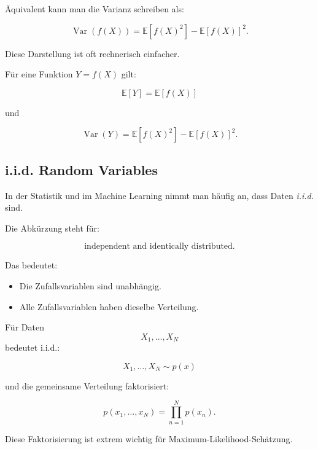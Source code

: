 \documentclass[11pt,a4paper]{scrartcl}
\begin{document}
\begin{calculationbox}
    Äquivalent kann man die Varianz schreiben als:

    \[
        \operatorname{Var}(f(X))
        =
        \mathbb{E}[f(X)^2]
        -
        \mathbb{E}[f(X)]^2.
    \]

    Diese Darstellung ist oft rechnerisch einfacher.
\end{calculationbox}

\begin{answerbox}
    Für eine Funktion \(Y=f(X)\) gilt:

    \[
        \boxed{
            \mathbb{E}[Y]
            =
            \mathbb{E}[f(X)]
        }
    \]

    und

    \[
        \boxed{
            \operatorname{Var}(Y)
            =
            \mathbb{E}[f(X)^2]
            -
            \mathbb{E}[f(X)]^2.
        }
    \]
\end{answerbox}

\subsection{i.i.d. Random Variables}

\begin{notebox}
    In der Statistik und im Machine Learning nimmt man häufig an, dass Daten
    \emph{i.i.d.} sind.

    Die Abkürzung steht für:

    \[
        \text{independent and identically distributed}.
    \]

    Das bedeutet:

    \begin{itemize}
        \item Die Zufallsvariablen sind unabhängig.
        \item Alle Zufallsvariablen haben dieselbe Verteilung.
    \end{itemize}
\end{notebox}

\begin{solutionbox}
    Für Daten
    \[
        X_1,\dots,X_N
    \]
    bedeutet i.i.d.:

    \[
        X_1,\dots,X_N
        \sim p(x)
    \]

    und die gemeinsame Verteilung faktorisiert:

    \[
        p(x_1,\dots,x_N)
        =
        \prod_{n=1}^{N} p(x_n).
    \]

    Diese Faktorisierung ist extrem wichtig für Maximum-Likelihood-Schätzung.
\end{solutionbox}
\end{document}
